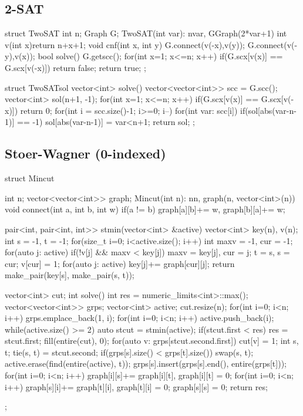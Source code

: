 \subsection{2-SAT}
\begin{cpp}
struct TwoSAT{
  int n; Graph G;
  TwoSAT(int var): n{var}, G{Graph(2*var+1)} {}
  int v(int x){return n+x+1;}
  void cnf(int x, int y)
    {G.connect(v(-x),v(y)); G.connect(v(-y),v(x));}
  bool solve(){
    G.getscc();
    for(int x=1; x<=n; x++) if(G.scx[v(x)] == G.scx[v(-x)])
      return false;
    return true;
  }
};

struct TwoSATsol{
  vector<int> solve(){
    vector<vector<int>> scc = G.scc();
    vector<int> sol(n+1, -1);
    for(int x=1; x<=n; x++)
      if(G.scx[v(x)] == G.scx[v(-x)]) return {0};
    for(int i = scc.size()-1; i>=0; i--)
      for(int var: scc[i]) if(sol[abs(var-n-1)] == -1)
        sol[abs(var-n-1)] = var<n+1;
    return sol;
  }
};
\end{cpp}

\subsection{Stoer-Wagner (0-indexed)}
\begin{cpp}
struct Mincut{
  int n; vector<vector<int>> graph;
  Mincut(int n): n{n}, graph(n, vector<int>(n)) {}
  void connect(int a, int b, int w)
    {if(a != b) graph[a][b]+= w, graph[b][a]+= w;}
  
  pair<int, pair<int, int>> stmin(vector<int> &active){
    vector<int> key(n), v(n);
    int s = -1, t = -1;
    for(size_t i=0; i<active.size(); i++){
      int maxv = -1, cur = -1;
      for(auto j: active) if(!v[j] && maxv < key[j])
        maxv = key[j], cur = j;
      t = s, s = cur; v[cur] = 1;
      for(auto j: active) key[j]+= graph[cur][j];
    }
    return make_pair(key[s], make_pair(s, t));
  }

  vector<int> cut;
  int solve(){
    int res = numeric_limits<int>::max();
    vector<vector<int>> grps; vector<int> active;
    cut.resize(n);
    for(int i=0; i<n; i++) grps.emplace_back(1, i);
    for(int i=0; i<n; i++) active.push_back(i);
    while(active.size() >= 2){
      auto stcut = stmin(active);
      if(stcut.first < res){
        res = stcut.first;
        fill(entire(cut), 0);
        for(auto v: grps[stcut.second.first]) cut[v] = 1;
      }
      int s, t; tie(s, t) = stcut.second;
      if(grps[s].size() < grps[t].size()) swap(s, t);
      active.erase(find(entire(active), t));
      grps[s].insert(grps[s].end(), entire(grps[t]));
      for(int i=0; i<n; i++)
        graph[i][s]+= graph[i][t], graph[i][t] = 0;
      for(int i=0; i<n; i++)
        graph[s][i]+= graph[t][i], graph[t][i] = 0;
      graph[s][s] = 0;
    }
    return res;
  }
};
\end{cpp}

